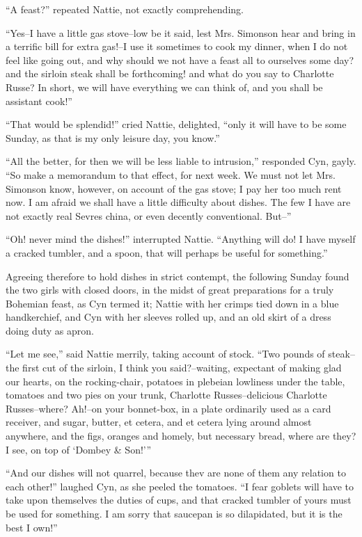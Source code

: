 ``A feast?'' repeated Nattie, not exactly comprehending.

``Yes--I have a little gas stove--low be it said, lest Mrs. Simonson hear
and bring in a terrific bill for extra gas!--I use it sometimes to cook
my dinner, when I do not feel like going out, and why should we not have
a feast all to ourselves some day? and the sirloin steak shall be
forthcoming! and what do you say to Charlotte Russe? In short, we will
have everything we can think of, and you shall be assistant cook!''

``That would be splendid!'' cried Nattie, delighted, ``only it will have to
be some Sunday, as that is my only leisure day, you know.''

``All the better, for then we will be less liable to intrusion,''
responded Cyn, gayly. ``So make a memorandum to that effect, for next
week. We must not let Mrs. Simonson know, however, on account of the gas
stove; I pay her too much rent now. I am afraid we shall have a little
difficulty about dishes. The few I have are not exactly real Sevres
china, or even decently conventional. But--''

``Oh! never mind the dishes!'' interrupted Nattie. ``Anything will do! I
have myself a cracked tumbler, and a spoon, that will perhaps be useful
for something.''

Agreeing therefore to hold dishes in strict contempt, the following
Sunday found the two girls with closed doors, in the midst of great
preparations for a truly Bohemian feast, as Cyn termed it; Nattie with
her crimps tied down in a blue handkerchief, and Cyn with her sleeves
rolled up, and an old skirt of a dress doing duty as apron.

``Let me see,'' said Nattie merrily, taking account of stock. ``Two pounds
of steak--the first cut of the sirloin, I think you said?--waiting,
expectant of making glad our hearts, on the rocking-chair, potatoes in
plebeian lowliness under the table, tomatoes and two pies on your trunk,
Charlotte Russes--delicious Charlotte Russes--where? Ah!--on your
bonnet-box, in a plate ordinarily used as a card receiver, and sugar,
butter, et cetera, and et cetera lying around almost anywhere, and the
figs, oranges and homely, but necessary bread, where are they? I see, on
top of `Dombey \& Son!'{}''

``And our dishes will not quarrel, because thev are none of them any
relation to each other!'' laughed Cyn, as she peeled the tomatoes. ``I
fear goblets will have to take upon themselves the duties of cups, and
that cracked tumbler of yours must be used for something. I am sorry
that saucepan is so dilapidated, but it is the best I own!''

